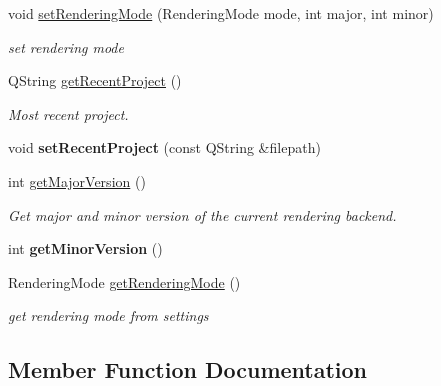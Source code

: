\begin{DoxyCompactItemize}
void \mbox{\hyperlink{classrev_1_1_settings_1_1_i_n_i_settings_a9e17e49c5dce9840f85e01dfc14d9630}{set\+Rendering\+Mode}} (Rendering\+Mode mode, int major, int minor)
\begin{DoxyCompactList}\small\item\em set rendering mode \end{DoxyCompactList}\item 
\mbox{\label{classrev_1_1_settings_1_1_i_n_i_settings_a33ca9d49b160cbeade0a36066734465b}} 
Q\+String \mbox{\hyperlink{classrev_1_1_settings_1_1_i_n_i_settings_a33ca9d49b160cbeade0a36066734465b}{get\+Recent\+Project}} ()
\begin{DoxyCompactList}\small\item\em Most recent project. \end{DoxyCompactList}\item 
\mbox{\label{classrev_1_1_settings_1_1_i_n_i_settings_a48abb6257af358d0b03c5e6f4671b288}} 
void {\bfseries set\+Recent\+Project} (const Q\+String \&filepath)
\item 
int \mbox{\hyperlink{classrev_1_1_settings_1_1_i_n_i_settings_a9eb319992a91f68561a6516e0740016b}{get\+Major\+Version}} ()
\begin{DoxyCompactList}\small\item\em Get major and minor version of the current rendering backend. \end{DoxyCompactList}\item 
\mbox{\label{classrev_1_1_settings_1_1_i_n_i_settings_a270ef7ce55964b43be291d4c702ee770}} 
int {\bfseries get\+Minor\+Version} ()
\item 
\mbox{\label{classrev_1_1_settings_1_1_i_n_i_settings_a0e3288f7316da2c9ee170b261ff9c09e}} 
Rendering\+Mode \mbox{\hyperlink{classrev_1_1_settings_1_1_i_n_i_settings_a0e3288f7316da2c9ee170b261ff9c09e}{get\+Rendering\+Mode}} ()
\begin{DoxyCompactList}\small\item\em get rendering mode from settings \end{DoxyCompactList}\end{DoxyCompactItemize}


\subsection{Member Function Documentation}
\mbox{\label{classrev_1_1_settings_1_1_i_n_i_settings_a9eb319992a91f68561a6516e0740016b}} 
